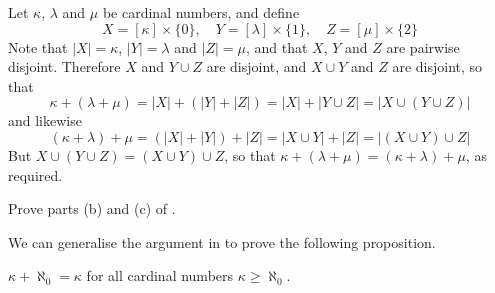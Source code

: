 \begin{cproof}[of {(a)}]
Let $\kappa$, $\lambda$ and $\mu$ be cardinal numbers, and define
\[ X = [\kappa] \times \{ 0 \}, \quad Y = [\lambda] \times \{ 1 \}, \quad Z = [\mu] \times \{ 2 \} \]
Note that $|X| = \kappa$, $|Y| = \lambda$ and $|Z| = \mu$, and that $X$, $Y$ and $Z$ are pairwise disjoint. Therefore $X$ and $Y \cup Z$ are disjoint, and $X \cup Y$ and $Z$ are disjoint, so that
\[ \kappa + (\lambda + \mu) = |X| + (|Y| + |Z|) = |X| + |Y \cup Z| = |X \cup (Y \cup Z) | \]
and likewise
\[ (\kappa + \lambda) + \mu = (|X| + |Y|) + |Z| = |X \cup Y| + |Z| = |(X \cup Y) \cup Z | \]
But $X \cup (Y \cup Z) = (X \cup Y) \cup Z$, so that $\kappa + (\lambda + \mu) = (\kappa + \lambda) + \mu$, as required.
\end{cproof}

\begin{exercise}
Prove parts (b) and (c) of .
\end{exercise}

We can generalise the argument in  to prove the following proposition.

\begin{proposition}
\label{propKappaPlusAlephNaughtEqualsKappa}
$\kappa + \aleph_0 = \kappa$ for all cardinal numbers $\kappa \ge \aleph_0$.
\end{proposition}

